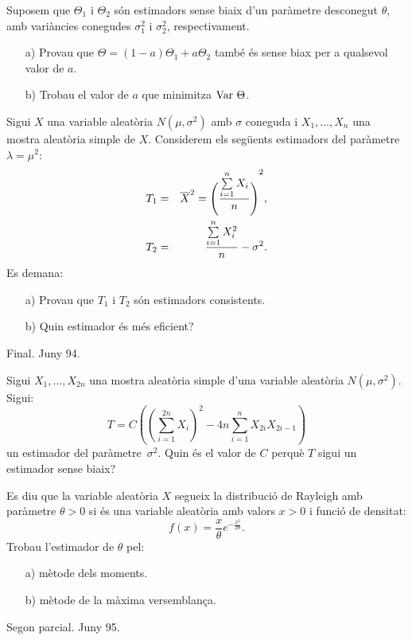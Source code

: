 \begin{prob}
{Suposem que $\Theta_1$ i $\Theta_2$ s\'on estimadors sense biaix
d'un par\`ametre desconegut $\theta$, amb vari\`ancies conegudes $\sigma_1^2$ i
$\sigma_2^2$, respectivament.
\begin{itemize}
\item[a)]{Provau que $\Theta =(1-a) \Theta_1 +a \Theta_2$ tamb\'e \'es sense
biax per a qualsevol valor de $a$.}
\item[b)]{Trobau el valor de $a$ que minimitza $\hbox{Var }\Theta$.}
\end{itemize}}
\end{prob}

\newpage

\begin{prob}
{Sigui $X$ una variable aleat\`oria $N(\mu,\sigma^2)$ amb $\sigma$ coneguda i $X_1,\ldots, X_n$
una mostra aleat\`oria simple de $X$. Considerem els seg\"uents estimadors del
par\`ametre $\lambda =\mu^2$:
\begin{eqnarray*}
T_1 & = & \overline{X}^2 = {\Biggl({\sum\limits_{i=1}^n
X_i\over n}\Biggr)}^2,\\  T_2 & = & {\sum\limits_{i=1}^n X_i^2 \over
n}-\sigma^2.\end{eqnarray*}
Es demana:
\begin{itemize}
\item[a)] {Provau que $T_1$ i $T_2$ s\'on estimadors consistents.}

\item[b)] {Quin estimador \'es m\'es eficient?}
\end{itemize}

{\footnotesize Final. Juny 94.}}
\end{prob}

\begin{prob}
{
Sigui $X_1,\ldots,X_{2n}$ una mostra aleat\`oria simple d'una variable
aleat\`oria $N(\mu,\sigma^2)$. Sigui:
\[
T=C\left({\left(\sum_{i=1}^{2n} X_i\right)}^2- 4 n\sum_{i=1}^{n}
X_{2i} X_{2i-1}\right)
\]
un estimador del par\`ametre~$\sigma^2$. Quin \'es el valor de $C$ perqu\`e
$T$ sigui un estimador sense biaix?
}
\end{prob}

\enlargethispage*{1000pt}

\begin{prob}
{
Es diu que la variable aleat\`oria $X$ segueix la distribuci\'o de 
Rayleigh amb par\`ametre $\theta >0$ si \'es una variable 
aleat\`oria amb valors $x>0$ i funci\'o de densitat:
\[
f(x)=\frac{x}{\theta} e^{-\frac{x^2}{2\theta}}.
\]
Trobau l'estimador de $\theta$ pel:
\begin{itemize}
\item[a)] m\`etode dels moments.
\item[b)] m\`etode de la m\`axima versemblan\c{c}a.
\end{itemize}

{\footnotesize Segon parcial. Juny 95.}
}
\end{prob}


